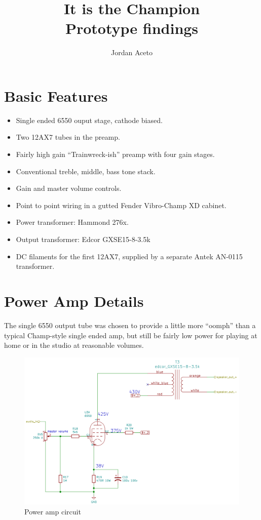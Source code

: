 \documentclass[pdftex,letterpaper,11pt]{article}
\title{%
	It is the Champion \\
	\large Prototype findings}
\author{Jordan Aceto}
\begin{document}
\maketitle

\tableofcontents

\newpage

\section{Basic Features}

\begin{itemize}
\item Single ended 6550 ouput stage, cathode biased.
\item Two 12AX7 tubes in the preamp.
\item Fairly high gain ``Trainwreck-ish'' preamp with four gain stages.
\item Conventional treble, middle, bass tone stack.
\item Gain and master volume controls.
\item Point to point wiring in a gutted Fender Vibro-Champ XD cabinet.
\item Power transformer: Hammond 276x.
\item Output transformer: Edcor GXSE15-8-3.5k
\item DC filaments for the first 12AX7, supplied by a separate Antek AN-0115 transformer.
\end{itemize}

\newpage

\section{Power Amp Details}

The single 6550 output tube was chosen to provide a little more ``oomph'' than a typical Champ-style single ended amp, but still be fairly low power for playing at home or in the studio at reasonable volumes.

\vspace{5mm}

\begin{figure}[H]
\centering
\caption{Power amp circuit}
\includegraphics[width=.8\textwidth]{power_amp_circuit.png}
\end{figure}
\end{document}
